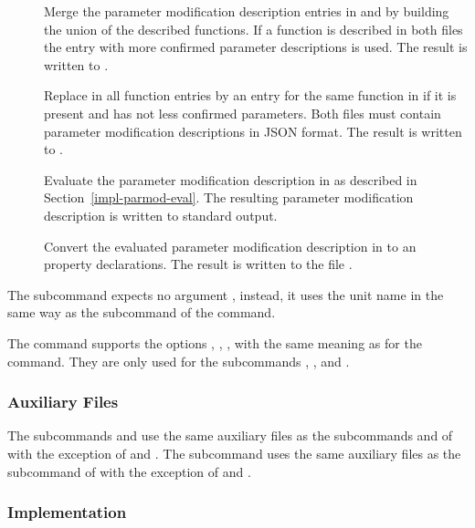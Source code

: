 \begin{description}
\item[] Merge the parameter modification description entries in  and  by building 
the union of the described functions. If a function is described in both files the entry with more confirmed parameter 
descriptions is used. The result is written to .

\item[] Replace in  all function entries by an entry for the same function in 
if it is present and has not less confirmed parameters. Both files must contain 
parameter modification descriptions in JSON format. The result is written to .

\item[] Evaluate the parameter modification description in  as described in 
Section~\ref{impl-parmod-eval}.  The resulting parameter modification description is written to standard output.

\item[] Convert the evaluated parameter modification description in  to an property declarations.
The result is written to the file .

\end{description}

The subcommand  expects no argument , instead, it uses the unit name in the same way as the subcommand  
of the  command.

The  command supports the options , , ,  with the same meaning as
for the  command. They are only used for the subcommands , , and .

\subsubsection{Auxiliary Files}

The subcommands  and  use the same auxiliary files as the subcommands  and  of  with 
the exception of  and .
The subcommand  uses the same auxiliary files as the subcommand  of  with the exception
of  and .

\subsubsection{Implementation}

